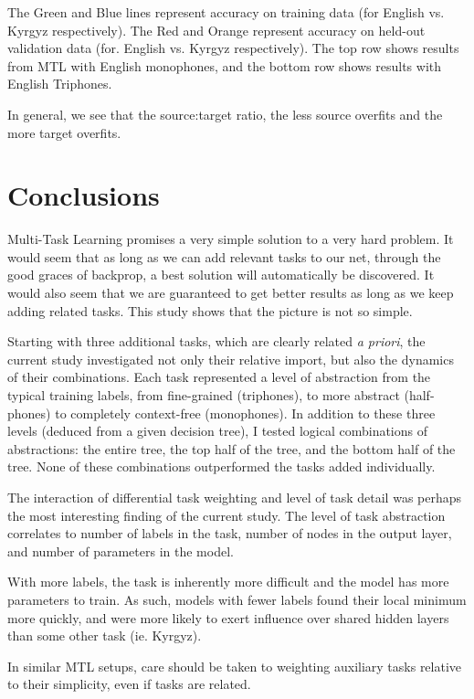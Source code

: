 \documentclass[a4paper]{article}
\begin{document}
The Green and Blue lines represent accuracy on training data (for English vs. Kyrgyz respectively). The Red and Orange represent accuracy on held-out validation data (for. English vs. Kyrgyz respectively). The top row shows results from MTL with English monophones, and the bottom row shows results with English Triphones.

In general, we see that the source:target ratio, the less source overfits and the more target overfits. 



\section{Conclusions}

Multi-Task Learning promises a very simple solution to a very hard problem. It would seem that as long as we can add relevant tasks to our net, through the good graces of backprop, a best solution will automatically be discovered. It would also seem that we are guaranteed to get better results as long as we keep adding related tasks. This study shows that the picture is not so simple.

Starting with three additional tasks, which are clearly related \textit{a priori}, the current study investigated not only their relative import, but also the dynamics of their combinations. Each task represented a level of abstraction from the typical training labels, from fine-grained (triphones), to more abstract (half-phones) to completely context-free (monophones). In addition to these three levels (deduced from a given decision tree), I tested logical combinations of abstractions: the entire tree, the top half of the tree, and the bottom half of the tree. None of these combinations outperformed the tasks added individually.

The interaction of differential task weighting and level of task detail was perhaps the most interesting finding of the current study. The level of task abstraction correlates to number of labels in the task, number of nodes in the output layer, and number of parameters in the model.

With more labels, the task is inherently more difficult and the model has more parameters to train. As such, models with fewer labels found their local minimum more quickly, and were more likely to exert influence over shared hidden layers than some other task (ie. Kyrgyz).

In similar MTL setups, care should be taken to weighting auxiliary tasks relative to their simplicity, even if tasks are related.
\end{document}
